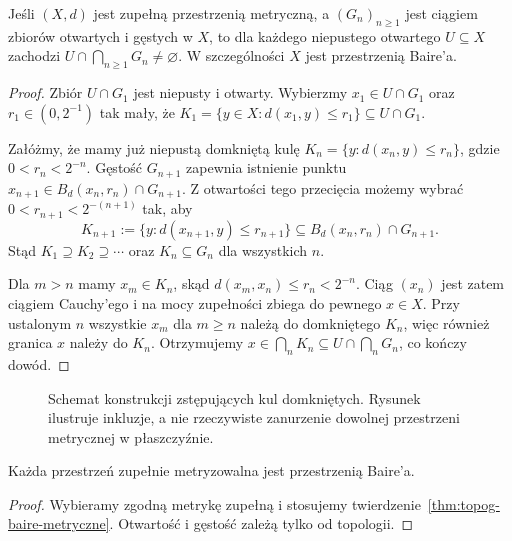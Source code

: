 \begin{twierdzenie}
\label{thm:topog-baire-metryczne}
Jeśli $(X,d)$ jest zupełną przestrzenią metryczną,
a $(G_n)_{n\ge1}$ jest ciągiem zbiorów otwartych
i gęstych w $X$, to dla każdego niepustego
otwartego $U\subseteq X$ zachodzi
$U\cap\bigcap_{n\ge1}G_n\ne\varnothing$.
W szczególności $X$ jest przestrzenią Baire'a.
\end{twierdzenie}
\begin{proof}
Zbiór $U\cap G_1$ jest niepusty i otwarty.
Wybierzmy $x_1\in U\cap G_1$ oraz
$r_1\in(0,2^{-1})$ tak mały, że
$K_1=\{y\in X:d(x_1,y)\le r_1\}
\subseteq U\cap G_1$.

Załóżmy, że mamy już niepustą domkniętą kulę
$K_n=\{y:d(x_n,y)\le r_n\}$, gdzie
$0<r_n<2^{-n}$. Gęstość $G_{n+1}$
zapewnia istnienie punktu
$x_{n+1}\in B_d(x_n,r_n)\cap G_{n+1}$.
Z otwartości tego przecięcia możemy
wybrać $0<r_{n+1}<2^{-(n+1)}$ tak, aby
\[
K_{n+1}:=\{y:d(x_{n+1},y)\le r_{n+1}\}
\subseteq B_d(x_n,r_n)\cap G_{n+1}.
\]
Stąd $K_1\supseteq K_2\supseteq\cdots$
oraz $K_n\subseteq G_n$ dla wszystkich $n$.

Dla $m>n$ mamy $x_m\in K_n$, skąd
$d(x_m,x_n)\le r_n<2^{-n}$. Ciąg $(x_n)$
jest zatem ciągiem Cauchy'ego i na mocy
zupełności zbiega do pewnego $x\in X$.
Przy ustalonym $n$ wszystkie $x_m$ dla
$m\ge n$ należą do domkniętego $K_n$,
więc również granica $x$ należy do $K_n$.
Otrzymujemy
$x\in\bigcap_nK_n\subseteq
U\cap\bigcap_nG_n$, co kończy dowód.
\end{proof}

\begin{figure}[htbp]
\centering
{}
\caption{Schemat konstrukcji zstępujących kul domkniętych.
Rysunek ilustruje inkluzje, a nie rzeczywiste zanurzenie
dowolnej przestrzeni metrycznej w płaszczyźnie.}
\label{fig:topog-baire-kule}
\end{figure}

\begin{wniosek}
\label{cor:topog-baire-zupelnie-metryzowalne}
Każda przestrzeń zupełnie metryzowalna
jest przestrzenią Baire'a.
\end{wniosek}
\begin{proof}
Wybieramy zgodną metrykę zupełną i stosujemy
twierdzenie~\ref{thm:topog-baire-metryczne}.
Otwartość i gęstość zależą tylko od topologii.
\end{proof}

